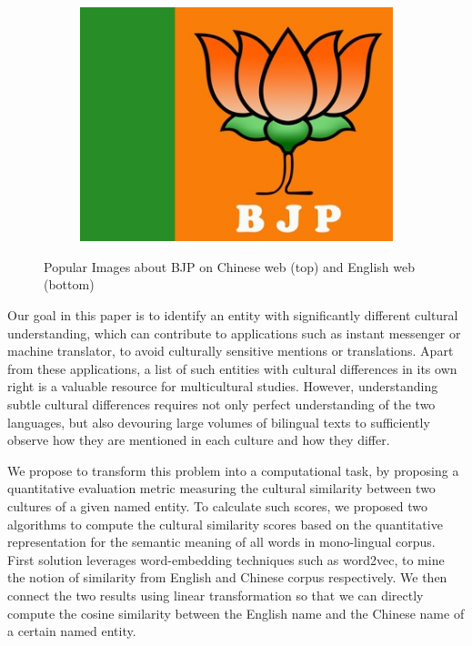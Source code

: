 \begin{figure}[!ht]
\begin{subfigure}{0.32\columnwidth}
        \includegraphics[width=\columnwidth]{bjp3.jpg}
    \end{subfigure}
	\caption{Popular Images about BJP on Chinese web (top) and
English web (bottom)}
	\label{fig:bjp}
\end{figure}

Our goal in this paper is to identify an entity with significantly different
cultural understanding, which can contribute to applications such
as instant messenger or machine translator,
to avoid culturally sensitive mentions or translations.
Apart from these applications, a list of such entities with
cultural differences in its own right is a valuable resource for
multicultural studies.
However, understanding subtle cultural differences requires not
only perfect understanding of the two languages, but also devouring
large volumes of bilingual texts to sufficiently observe how
they are mentioned in each culture and how they differ.

We propose to transform this problem into a computational task,
by proposing a quantitative evaluation metric measuring
the cultural similarity between two cultures of a given named entity.
To calculate such scores, we proposed two algorithms to compute
the cultural similarity scores based on the quantitative representation
for the semantic meaning of all words in mono-lingual corpus.
First solution leverages
word-embedding techniques such as word2vec, to mine the notion of similarity from English and Chinese corpus respectively.
We then connect the two results using linear transformation so that we can directly compute the cosine similarity between the English name and the Chinese name of a certain named entity.

